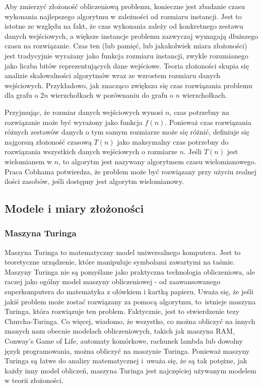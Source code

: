 Aby zmierzyć złożoność obliczeniową problemu, konieczne jest zbadanie czasu wykonania najlepszego algorytmu w zależności od rozmiaru instancji. Jest to istotne ze względu na fakt, że czas wykonania zależy od konkretnego zestawu danych wejściowych, a większe instancje problemu zazwyczaj wymagają dłuższego czasu na rozwiązanie. Czas ten (lub pamięć, lub jakakolwiek miara złożoności) jest tradycyjnie wyrażany jako funkcja rozmiaru instancji, zwykle rozumianego jako liczba bitów reprezentujących dane wejściowe. Teoria złożoności skupia się analizie skalowalności algorytmów wraz ze wzrostem rozmiaru danych wejściowych. Przykładowo, jak znacząco zwiększa się czas rozwiązania problemu dla grafu o $2n$ wierzchołkach w porównaniu do grafu o $n$ wierzchołkach.

Przyjmując, że rozmiar danych wejściowych wynosi $n$, czas potrzebny na rozwiązanie może być wyrażony jako funkcja $f(n)$.  Ponieważ czas rozwiązania różnych zestawów danych o tym samym rozmiarze może się różnić, definiuje się najgorszą złożoność czasową $T(n)$ jako maksymalny czas potrzebny do rozwiązania wszystkich danych wejściowych o rozmiarze $n$.  Jeśli $T(n)$ jest wielomianem w $n$, to algorytm jest nazywany algorytmem czasu wielomianowego. Praca Cobhama potwierdza, że problem może być rozwiązany przy użyciu realnej ilości zasobów, jeśli dostępny jest algorytm wielomianowy.

	\subsection{Modele i miary złożoności}
	
	\subsubsection{Maszyna Turinga}
Maszyna Turinga to matematyczny model uniwersalnego komputera. Jest to teoretyczne urządzenie, które manipuluje symbolami zawartymi na taśmie. Maszyny Turinga nie są pomyślane jako praktyczna technologia obliczeniowa, ale raczej jako ogólny model maszyny obliczeniowej - od zaawansowanego superkomputera do matematyka z ołówkiem i kartką papieru. Uważa się, że jeśli jakiś problem może zostać rozwiązany za pomocą algorytmu, to~istnieje maszyna Turinga, która rozwiązuje ten problem. Faktycznie, jest to stwierdzenie tezy Churcha-Turinga. Co więcej, wiadomo, że wszystko, co można obliczyć na innych znanych nam obecnie modelach obliczeniowych, takich jak maszyna RAM, Conway's Game of Life, automaty komórkowe, rachunek lambda lub dowolny język programowania, można obliczyć na maszynie Turinga. Ponieważ maszyny Turinga są łatwe do analizy matematycznej i~uważa się, że są tak potężne, jak każdy inny model obliczeń, maszyna Turinga jest najczęściej używanym modelem w teorii złożoności.

